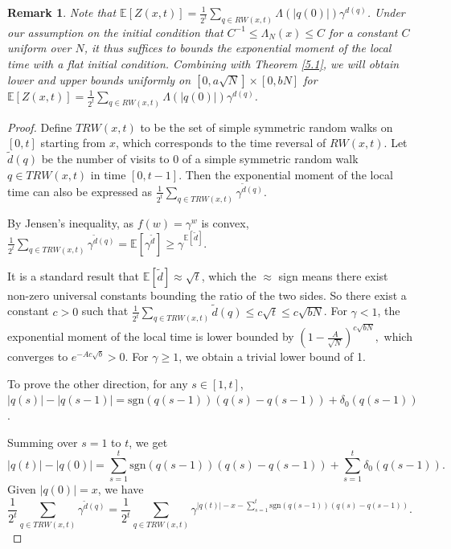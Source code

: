 \documentclass[10pt]{article}
\newtheorem{remark}[theorem]{Remark}
\begin{document}
\begin{remark}
Note that $\mathbb{E}[{Z(x,t)}]=\frac{1}{2^t}\sum_{q \in RW(x, t)} \Lambda(|q(0)|) \gamma^{d(q)}$. Under our assumption on the initial condition that $C^{-1} \leq \Lambda_N(x) \leq C$ for a  constant $C$ uniform over $N$, it thus suffices to bounds the exponential moment of the local time with a flat initial condition. Combining with Theorem \ref{5.1}, we will obtain  lower and upper bounds uniformly on $[0,a\sqrt{N}] \times [0,bN]$ for $\mathbb{E}[{Z(x,t)}]=\frac{1}{2^t}\sum_{q \in RW(x, t)} \Lambda(|q(0)|) \gamma^{d(q)}$.
\end{remark}

\begin{proof}

Define $TRW(x,t)$ to be the set of simple symmetric random walks on $[0, t]$ starting from $x$, which corresponds to the time reversal of $RW(x,t)$. Let $\tilde{d}(q)$ be the number of visits to 0 of a simple symmetric random walk $q \in TRW(x, t)$ in time $[0, t-1]$. Then the exponential moment of the local time can also be expressed as $\frac{1}{2^{t}}\sum_{q \in TRW(x,t)} \gamma^{\tilde{d}(q)}.$


By Jensen's inequality, as $f(w)=\gamma^w$ is convex, $\frac{1}{2^{t}}\sum_{q \in TRW(x,t)} \gamma^{\tilde{d}(q)} =\mathbb{E}[\gamma^{\tilde{d}}] \geq \gamma^{\mathbb{E}[\tilde{d}]}.$

It is a standard result that $\mathbb{E}[\tilde{d}] \approx \sqrt{t}$, which the $\approx$ sign means there exist non-zero universal constants bounding the ratio of the two sides. So there exist a constant $c>0$ such that $\frac{1}{2^{t}}\sum_{q \in TRW(x,t)} \tilde{d}(q) \leq c\sqrt{t} \leq c\sqrt{bN}$. For $\gamma <1$, the exponential moment of the local time is lower bounded by
$(1-\frac{A}{\sqrt{N}})^{c\sqrt{bN}},$
which converges to $e^{-Ac\sqrt{b}} >0$. For $\gamma\geq 1$, we obtain a trivial lower bound of 1.

To prove the other direction, for any $s \in [1,t]$,
 $|q(s)|-|q(s-1)| = \text{sgn}(q(s-1))(q(s)-q(s-1))+\delta_0(q(s-1))$.

Summing over $s=1$ to $t$, we get
\begin{equation} 
    |q(t)|-|q(0)|=\sum_{s=1}^t \text{sgn}(q(s-1))(q(s)-q(s-1)) + \sum_{s=1}^t \delta_0(q(s-1)).
\end{equation}
Given $|q(0)|=x$, we have
\begin{equation} \label{mean}
    \frac{1}{2^t}\sum_{q \in TRW(x,t)} \gamma^{\tilde{d}(q)}=\frac{1}{2^{t}}\sum_{q \in TRW(x,t)} \gamma^{|q(t)|-x-\sum_{s=1}^t \text{sgn}(q(s-1))(q(s)-q(s-1))}.
\end{equation}


\end{proof}
\end{document}
